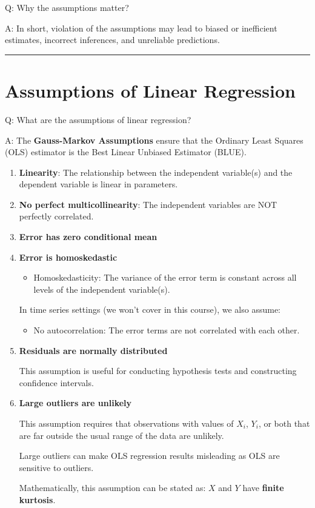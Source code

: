 \documentclass[
  12pt,
  a4paper,
]{scrbook}
\providecommand{\tightlist}{%
  \setlength{\itemsep}{0pt}\setlength{\parskip}{0pt}}
\renewcommand{\tightlist}{\setlength{\itemsep}{0.5\baselineskip}\setlength{\parskip}{0.2\baselineskip}}
\theoremstyle{plain}
\theoremstyle{definition}
\theoremstyle{remark}
\begin{document}
Q: Why the assumptions matter?

A: In short, violation of the assumptions may lead to biased or
inefficient estimates, incorrect inferences, and unreliable predictions.

\begin{center}\rule{0.5\linewidth}{0.5pt}\end{center}

\section{Assumptions of Linear
Regression}\label{assumptions-of-linear-regression}

Q: What are the assumptions of linear regression?

A: The \textbf{Gauss-Markov Assumptions} ensure that the Ordinary Least
Squares (OLS) estimator is the Best Linear Unbiased Estimator (BLUE).

\begin{enumerate}
\def\labelenumi{\arabic{enumi}.}
\item
  \textbf{Linearity}: The relationship between the independent
  variable(s) and the dependent variable is linear in parameters.
\item
  \textbf{No perfect multicollinearity}: The independent variables are
  NOT {perfectly correlated.}
\item
  \textbf{Error has zero conditional mean}
\item
  \textbf{Error is homoskedastic}

  \begin{itemize}
  \tightlist
  \item
    Homoskedasticity: The variance of the error term is constant across
    all levels of the independent variable(s).
  \end{itemize}

  {In time series settings (we won't cover in this course), we also
  assume:}

  \begin{itemize}
  \tightlist
  \item
    {No autocorrelation: The error terms are not correlated with each
    other.}
  \end{itemize}
\item
  \textbf{Residuals are normally distributed}

  This assumption is useful for conducting hypothesis tests and
  constructing confidence intervals.
\item
  \textbf{Large outliers are unlikely}

  This assumption requires that observations with values of \(X_i\),
  \(Y_i\), or both that are far outside the usual range of the data are
  unlikely.

  Large outliers can make OLS regression results misleading as OLS are
  sensitive to outliers.

  Mathematically, this assumption can be stated as: \(X\) and \(Y\) have
  \textbf{finite kurtosis}.
\end{enumerate}
\end{document}
